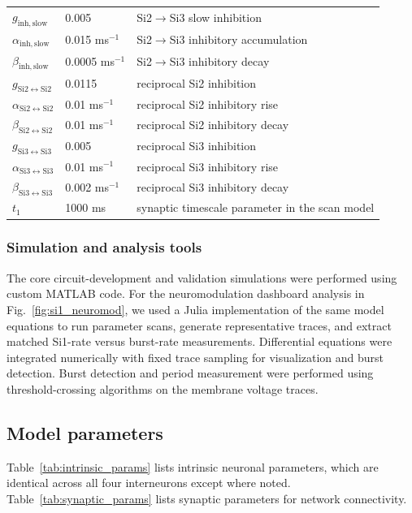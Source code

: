 \begin{table}[htbp]
\begin{tabular}{|l|l|l|}
$g_{\mathrm{inh,slow}}$ & 0.005 & Si2$\to$Si3 slow inhibition \\
$\alpha_{\mathrm{inh,slow}}$ & 0.015 ms$^{-1}$ & Si2$\to$Si3 inhibitory accumulation \\
$\beta_{\mathrm{inh,slow}}$ & 0.0005 ms$^{-1}$ & Si2$\to$Si3 inhibitory decay \\
$g_{\mathrm{Si2\leftrightarrow Si2}}$ & 0.0115 & reciprocal Si2 inhibition \\
$\alpha_{\mathrm{Si2\leftrightarrow Si2}}$ & 0.01 ms$^{-1}$ & reciprocal Si2 inhibitory rise \\
$\beta_{\mathrm{Si2\leftrightarrow Si2}}$ & 0.01 ms$^{-1}$ & reciprocal Si2 inhibitory decay \\
$g_{\mathrm{Si3\leftrightarrow Si3}}$ & 0.005 & reciprocal Si3 inhibition \\
$\alpha_{\mathrm{Si3\leftrightarrow Si3}}$ & 0.01 ms$^{-1}$ & reciprocal Si3 inhibitory rise \\
$\beta_{\mathrm{Si3\leftrightarrow Si3}}$ & 0.002 ms$^{-1}$ & reciprocal Si3 inhibitory decay \\
$t_1$ & 1000 ms & synaptic timescale parameter in the scan model \\
\hline
\end{tabular}
\end{table}


\subsubsection*{Simulation and analysis tools}

The core circuit-development and validation simulations were performed using custom MATLAB code.
For the neuromodulation dashboard analysis in Fig.~\ref{fig:si1_neuromod}, we used a Julia implementation of the same model equations to run parameter scans, generate representative traces, and extract matched Si1-rate versus burst-rate measurements.
Differential equations were integrated numerically with fixed trace sampling for visualization and burst detection.
Burst detection and period measurement were performed using threshold-crossing algorithms on the membrane voltage traces.


\subsection*{Model parameters}

Table~\ref{tab:intrinsic_params} lists intrinsic neuronal parameters, which are identical across all four interneurons except where noted.
Table~\ref{tab:synaptic_params} lists synaptic parameters for network connectivity.

